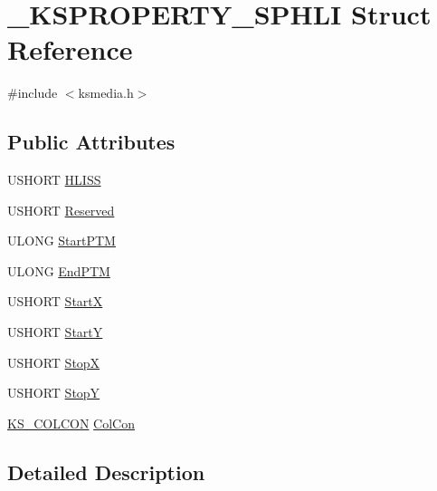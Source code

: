 \hypertarget{struct___k_s_p_r_o_p_e_r_t_y___s_p_h_l_i}{}\section{\+\_\+\+K\+S\+P\+R\+O\+P\+E\+R\+T\+Y\+\_\+\+S\+P\+H\+LI Struct Reference}
\label{struct___k_s_p_r_o_p_e_r_t_y___s_p_h_l_i}


{\ttfamily \#include $<$ksmedia.\+h$>$}

\subsection*{Public Attributes}
\begin{DoxyCompactItemize}
\item 
U\+S\+H\+O\+RT \hyperlink{struct___k_s_p_r_o_p_e_r_t_y___s_p_h_l_i_a45a7ea8654af7e6ba774b5193203cd7f}{H\+L\+I\+SS}
\item 
U\+S\+H\+O\+RT \hyperlink{struct___k_s_p_r_o_p_e_r_t_y___s_p_h_l_i_aa38b4c54fc9172eb19e889bc2ada2115}{Reserved}
\item 
U\+L\+O\+NG \hyperlink{struct___k_s_p_r_o_p_e_r_t_y___s_p_h_l_i_a5ee29828f2ca672a7a7769f2b7f4e9ae}{Start\+P\+TM}
\item 
U\+L\+O\+NG \hyperlink{struct___k_s_p_r_o_p_e_r_t_y___s_p_h_l_i_a30886b62ec6656e17734020e1d6106e8}{End\+P\+TM}
\item 
U\+S\+H\+O\+RT \hyperlink{struct___k_s_p_r_o_p_e_r_t_y___s_p_h_l_i_aed47bc6b8d66f8efaae3c85c8a41edf6}{StartX}
\item 
U\+S\+H\+O\+RT \hyperlink{struct___k_s_p_r_o_p_e_r_t_y___s_p_h_l_i_add8a3cf7875c56e75fad508fbeb1e60d}{StartY}
\item 
U\+S\+H\+O\+RT \hyperlink{struct___k_s_p_r_o_p_e_r_t_y___s_p_h_l_i_a93787865f048824d9d2626930d26ba49}{StopX}
\item 
U\+S\+H\+O\+RT \hyperlink{struct___k_s_p_r_o_p_e_r_t_y___s_p_h_l_i_a76a56f278a7eed4a44fb2764b231bdbf}{StopY}
\item 
\hyperlink{ksmedia_8h_a5a485270564c0d05904333c9b67be970}{K\+S\+\_\+\+C\+O\+L\+C\+ON} \hyperlink{struct___k_s_p_r_o_p_e_r_t_y___s_p_h_l_i_a65b886aad652a83f8a0f2c6170f1aeea}{Col\+Con}
\end{DoxyCompactItemize}


\subsection{Detailed Description}



